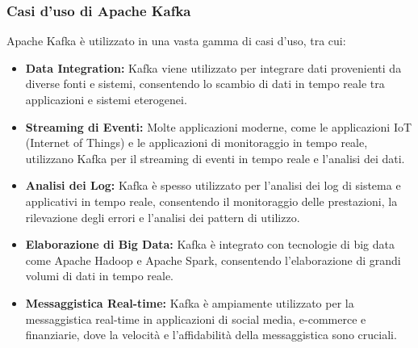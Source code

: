 \subsubsection*{Casi d'uso di Apache Kafka}

Apache Kafka è utilizzato in una vasta gamma di casi d'uso, tra cui:

\begin{itemize}
  \item \textbf{Data Integration:} Kafka viene utilizzato per integrare dati provenienti da diverse fonti e sistemi, consentendo lo scambio di dati in tempo reale tra applicazioni e sistemi eterogenei.
  
  \item \textbf{Streaming di Eventi:} Molte applicazioni moderne, come le applicazioni IoT (Internet of Things) e le applicazioni di monitoraggio in tempo reale, utilizzano Kafka per il streaming di eventi in tempo reale e l'analisi dei dati.
  
  \item \textbf{Analisi dei Log:} Kafka è spesso utilizzato per l'analisi dei log di sistema e applicativi in tempo reale, consentendo il monitoraggio delle prestazioni, la rilevazione degli errori e l'analisi dei pattern di utilizzo.
  
  \item \textbf{Elaborazione di Big Data:} Kafka è integrato con tecnologie di big data come Apache Hadoop e Apache Spark, consentendo l'elaborazione di grandi volumi di dati in tempo reale.
  
  \item \textbf{Messaggistica Real-time:} Kafka è ampiamente utilizzato per la messaggistica real-time in applicazioni di social media, e-commerce e finanziarie, dove la velocità e l'affidabilità della messaggistica sono cruciali.
\end{itemize}